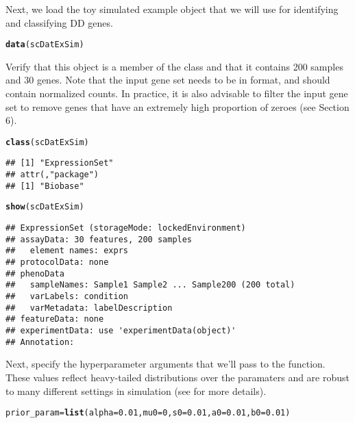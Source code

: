 \documentclass{article}\usepackage[]{graphicx}\usepackage[]{color}
\makeatletter
\newcommand{\hlnum}[1]{\textcolor[rgb]{0.686,0.059,0.569}{#1}}%
\newcommand{\hlstd}[1]{\textcolor[rgb]{0.345,0.345,0.345}{#1}}%
\newcommand{\hlkwb}[1]{\textcolor[rgb]{0.69,0.353,0.396}{#1}}%
\newcommand{\hlkwc}[1]{\textcolor[rgb]{0.333,0.667,0.333}{#1}}%
\newcommand{\hlkwd}[1]{\textcolor[rgb]{0.737,0.353,0.396}{\textbf{#1}}}%
\newenvironment{kframe}{%
 \def\at@end@of@kframe{}%
 \ifinner\ifhmode%
  \def\at@end@of@kframe{\end{minipage}}%
  \begin{minipage}{\columnwidth}%
 \fi\fi%
 \def\FrameCommand##1{\hskip\@totalleftmargin \hskip-\fboxsep
 \colorbox{shadecolor}{##1}\hskip-\fboxsep
     \hskip-\linewidth \hskip-\@totalleftmargin \hskip\columnwidth}%
 \MakeFramed {\advance\hsize-\width
   \@totalleftmargin\z@ \linewidth\hsize
   \@setminipage}}%
 {\par\unskip\endMakeFramed%
 \at@end@of@kframe}
\newenvironment{knitrout}{}{} %
\makeatother
\begin{document}
Next, we load the toy simulated example  object that we will use for identifying and classifying DD genes.
\begin{knitrout}
\color{fgcolor}\begin{kframe}
\begin{alltt}
\hlkwd{data}\hlstd{(scDatExSim)}
\end{alltt}
\end{kframe}
\end{knitrout}

Verify that this object is a member of the  class and that it contains 200 samples and 30 genes.  Note that the input gene set needs to be in  format, and should contain normalized counts.  In practice, it is also advisable to filter the input gene set to remove genes that have an extremely high proportion of zeroes (see Section 6). 
\begin{knitrout}
\color{fgcolor}\begin{kframe}
\begin{alltt}
\hlkwd{class}\hlstd{(scDatExSim)}
\end{alltt}
\begin{verbatim}
## [1] "ExpressionSet"
## attr(,"package")
## [1] "Biobase"
\end{verbatim}
\begin{alltt}
\hlkwd{show}\hlstd{(scDatExSim)}
\end{alltt}
\begin{verbatim}
## ExpressionSet (storageMode: lockedEnvironment)
## assayData: 30 features, 200 samples 
##   element names: exprs 
## protocolData: none
## phenoData
##   sampleNames: Sample1 Sample2 ... Sample200 (200 total)
##   varLabels: condition
##   varMetadata: labelDescription
## featureData: none
## experimentData: use 'experimentData(object)'
## Annotation:
\end{verbatim}
\end{kframe}
\end{knitrout}

Next, specify the hyperparameter arguments that we'll pass to the  function.  These values reflect heavy-tailed distributions over the paramaters and are robust to many different settings in simulation (see \cite{korthauer2015} for more details).

\begin{knitrout}
\color{fgcolor}\begin{kframe}
\begin{alltt}
\hlstd{prior_param}\hlkwb{=}\hlkwd{list}\hlstd{(}\hlkwc{alpha}\hlstd{=}\hlnum{0.01}\hlstd{,} \hlkwc{mu0}\hlstd{=}\hlnum{0}\hlstd{,} \hlkwc{s0}\hlstd{=}\hlnum{0.01}\hlstd{,} \hlkwc{a0}\hlstd{=}\hlnum{0.01}\hlstd{,} \hlkwc{b0}\hlstd{=}\hlnum{0.01}\hlstd{)}
\end{alltt}
\end{kframe}
\end{knitrout}
 
\end{document}
